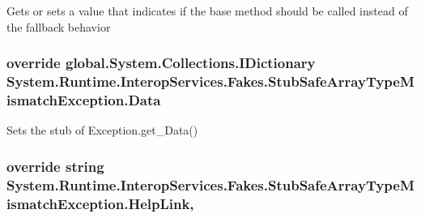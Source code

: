 Gets or sets a value that indicates if the base method should be called instead of the fallback behavior

\hypertarget{class_system_1_1_runtime_1_1_interop_services_1_1_fakes_1_1_stub_safe_array_type_mismatch_exception_a6ce5b9f924798581a73cb91c4a152dc4}{
\subsubsection[{Data}]{\setlength{\rightskip}{0pt plus 5cm}override global.\-System.\-Collections.\-I\-Dictionary System.\-Runtime.\-Interop\-Services.\-Fakes.\-Stub\-Safe\-Array\-Type\-Mismatch\-Exception.\-Data\hspace{0.3cm}{\ttfamily [get]}}}\label{class_system_1_1_runtime_1_1_interop_services_1_1_fakes_1_1_stub_safe_array_type_mismatch_exception_a6ce5b9f924798581a73cb91c4a152dc4}


Sets the stub of Exception.\-get\-\_\-\-Data()

\hypertarget{class_system_1_1_runtime_1_1_interop_services_1_1_fakes_1_1_stub_safe_array_type_mismatch_exception_a2bf31d30957e67de44df48bdc2e14a30}{
\subsubsection[{Help\-Link}]{\setlength{\rightskip}{0pt plus 5cm}override string System.\-Runtime.\-Interop\-Services.\-Fakes.\-Stub\-Safe\-Array\-Type\-Mismatch\-Exception.\-Help\-Link\hspace{0.3cm}{\ttfamily [get]}, {\ttfamily [set]}}}\label{class_system_1_1_runtime_1_1_interop_services_1_1_fakes_1_1_stub_safe_array_type_mismatch_exception_a2bf31d30957e67de44df48bdc2e14a30}


